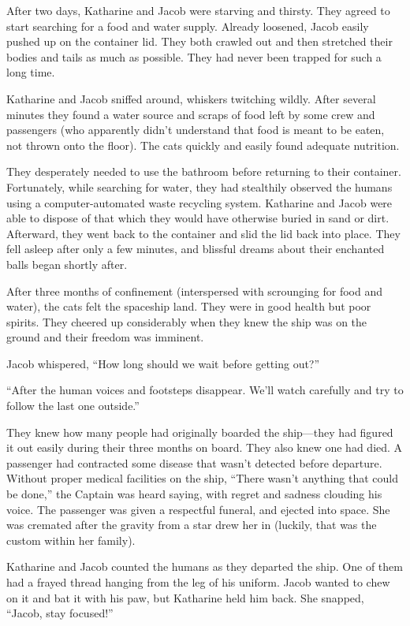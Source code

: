 \timesep

After two days, Katharine and Jacob were starving and thirsty. They agreed to start searching for a food and water supply. Already loosened, Jacob easily pushed up on the container lid. They both crawled out and then stretched their bodies and tails as much as possible. They had never been trapped for such a  long time.

Katharine and Jacob sniffed around, whiskers twitching wildly. After several minutes they found a water source and scraps of food left by some crew and passengers (who apparently didn't understand that food is meant to be eaten, not thrown onto the floor). The cats quickly and easily found adequate nutrition.

They desperately needed to use the bathroom before returning to their container. Fortunately, while searching for water, they had stealthily observed the humans using a computer-automated waste recycling system. Katharine and Jacob were able to dispose of that which they would have otherwise buried in sand or dirt. Afterward, they went back to the container and slid the lid back into place. They fell asleep after only a few minutes, and blissful dreams about their enchanted balls began shortly after.

\timesep

After three months of confinement (interspersed with scrounging for food and water), the cats felt the spaceship land. They were in good health but poor spirits. They cheered up considerably when they knew the ship was on the ground and their freedom was imminent.

Jacob whispered, “How long should we wait before getting out?”

“After the human voices and footsteps disappear. We'll watch carefully and try to follow the last one outside.”

They knew how many people had originally boarded the ship—they had figured it out easily during their three months on board. They also knew one had died. A passenger had contracted some disease that wasn't detected before departure. Without proper medical facilities on the ship, “There wasn't anything that could be done,” the Captain was heard saying, with regret and sadness clouding his voice. The passenger was given a respectful funeral, and ejected into space. She was cremated after the gravity from a star drew her in (luckily, that was the custom within her family).

Katharine and Jacob counted the humans as they departed the ship. One of them had a frayed thread hanging from the leg of his uniform. Jacob wanted to chew on it and bat it with his paw, but Katharine held him back. She snapped,  “Jacob, stay focused!”

